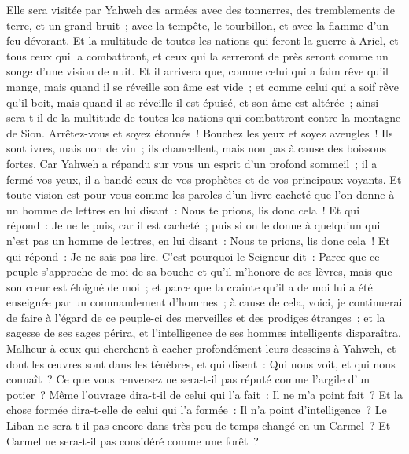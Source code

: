\begin{multicols}{2}
Elle sera visitée par Yahweh des armées avec des tonnerres, des tremblements de terre, et un grand bruit~; avec la tempête, le tourbillon, et avec la flamme d'un feu dévorant.
Et la multitude de toutes les nations qui feront la guerre à Ariel, et tous ceux qui la combattront, et ceux qui la serreront de près seront comme un songe d'une vision de nuit.
Et il arrivera que, comme celui qui a faim rêve qu'il mange, mais quand il se réveille son âme est vide~; et comme celui qui a soif rêve qu'il boit, mais quand il se réveille il est épuisé, et son âme est altérée~; ainsi sera-t-il de la multitude de toutes les nations qui combattront contre la montagne de Sion.
Arrêtez-vous et soyez étonnés~! Bouchez les yeux et soyez aveugles~! Ils sont ivres, mais non de vin~; ils chancellent, mais non pas à cause des boissons fortes.
Car Yahweh a répandu sur vous un esprit d'un profond sommeil~; il a fermé vos yeux, il a bandé ceux de vos prophètes et de vos principaux voyants.
Et toute vision est pour vous comme les paroles d'un livre cacheté que l'on donne à un homme de lettres en lui disant~: Nous te prions, lis donc cela~! Et qui répond~: Je ne le puis, car il est cacheté~;
puis si on le donne à quelqu'un qui n'est pas un homme de lettres, en lui disant~: Nous te prions, lis donc cela~! Et qui répond~: Je ne sais pas lire.
C'est pourquoi le Seigneur dit~: Parce que ce peuple s'approche de moi de sa bouche et qu'il m'honore de ses lèvres, mais que son cœur est éloigné de moi~; et parce que la crainte qu'il a de moi lui a été enseignée par un commandement d'hommes~;
à cause de cela, voici, je continuerai de faire à l'égard de ce peuple-ci des merveilles et des prodiges étranges~; et la sagesse de ses sages périra, et l'intelligence de ses hommes intelligents disparaîtra.
Malheur à ceux qui cherchent à cacher profondément leurs desseins à Yahweh, et dont les œuvres sont dans les ténèbres, et qui disent~: Qui nous voit, et qui nous connaît~?
Ce que vous renversez ne sera-t-il pas réputé comme l'argile d'un potier~? Même l'ouvrage dira-t-il de celui qui l'a fait~: Il ne m'a point fait~? Et la chose formée dira-t-elle de celui qui l'a formée~: Il n'a point d'intelligence~?
Le Liban ne sera-t-il pas encore dans très peu de temps changé en un Carmel~? Et Carmel ne sera-t-il pas considéré comme une forêt~?

\end{multicols}

